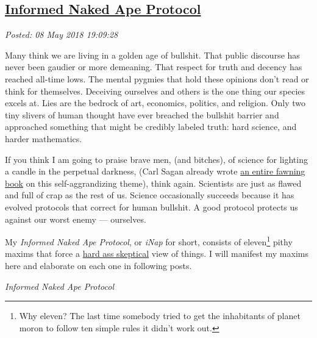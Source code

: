 %

\subsection*{\href{https://analyzethedatanotthedrivel.org/2018/05/08/informed-naked-ape-protocol/}{Informed Naked Ape Protocol}}


\noindent\emph{Posted: 08 May 2018 19:09:28}
\vspace{6pt}

Many think we are living in a golden age of bullshit. That public
discourse has never been gaudier or more demeaning. That respect for
truth and decency has reached all-time lows. The mental pygmies that
hold these opinions don't read or think for themselves. Deceiving
ourselves and others is the one thing our species excels at. Lies are
the bedrock of art, economics, politics, and religion. Only two tiny
slivers of human thought have ever breached the bullshit barrier and
approached something that might be credibly labeled truth: hard science,
and harder mathematics.

If you think I am going to praise brave men, (and bitches), of science
for lighting a candle in the perpetual darkness, (Carl Sagan already
wrote
\href{https://www.goodreads.com/book/show/17349.The_Demon_Haunted_World}{an
entire fawning book} on this self-aggrandizing theme), think again.
Scientists are just as flawed and full of crap as the rest of us.
Science occasionally succeeds because it has evolved protocols that
correct for human bullshit. A good protocol protects us against our
worst enemy --- ourselves.

My \emph{Informed Naked Ape Protocol}, or \emph{iNap} for short,
consists of eleven\footnote{Why eleven? The last time somebody tried to get the inhabitants of
  planet moron to follow ten simple rules it didn't work
  out.
} pithy
maxims that force a
\href{https://analyzethedatanotthedrivel.org/2009/10/29/hard-ass-skeptic-rules/}{hard
ass skeptical} view of things. I will manifest my maxims here and
elaborate on each one in following posts.

\bigskip

\emph{Informed Naked Ape Protocol}

